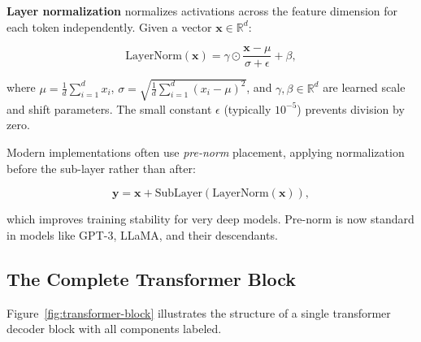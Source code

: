 \textbf{Layer normalization} normalizes activations across the feature dimension for each token independently. Given a vector $\mathbf{x} \in \mathbb{R}^d$:

\begin{equation}
\text{LayerNorm}(\mathbf{x}) = \gamma \odot \frac{\mathbf{x} - \mu}{\sigma + \epsilon} + \beta,
\label{eq:layernorm}
\end{equation}

where $\mu = \frac{1}{d}\sum_{i=1}^{d} x_i$, $\sigma = \sqrt{\frac{1}{d}\sum_{i=1}^{d}(x_i - \mu)^2}$, and $\gamma, \beta \in \mathbb{R}^d$ are learned scale and shift parameters. The small constant $\epsilon$ (typically $10^{-5}$) prevents division by zero.

Modern implementations often use \emph{pre-norm} placement, applying normalization before the sub-layer rather than after:

\begin{equation}
\mathbf{y} = \mathbf{x} + \text{SubLayer}(\text{LayerNorm}(\mathbf{x})),
\label{eq:pre-norm}
\end{equation}

which improves training stability for very deep models. Pre-norm is now standard in models like GPT-3, LLaMA, and their descendants.

\subsection{The Complete Transformer Block}

Figure~\ref{fig:transformer-block} illustrates the structure of a single transformer decoder block with all components labeled.

